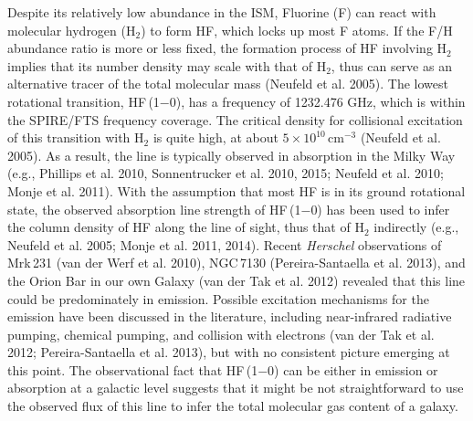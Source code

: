 \documentclass[preprint]{aastex}
\begin{document}
Despite its relatively low abundance in the ISM, Fluorine (F) can react with molecular hydrogen 
(H$_2$) to form HF, which locks up most F atoms. If the F/H abundance ratio is more or less
fixed, the formation process of HF involving H$_2$ implies that its number density may 
scale with that of H$_2$, thus can serve as an alternative tracer of the total molecular 
mass (Neufeld et al. 2005).  The lowest rotational transition, HF\,(1$-$0), has a frequency of
1232.476 GHz, which is within the SPIRE/FTS frequency coverage.  The critical density for collisional 
excitation of this transition with H$_2$ is quite high, at about $5\times 10^{10}$\,cm$^{-3}$  
(Neufeld et al. 2005).  As a result, the line is typically observed in absorption 
in the Milky Way  (e.g., Phillips et al. 2010, Sonnentrucker et al. 2010, 2015; Neufeld et al. 2010; 
Monje et al. 2011).   With the assumption that most HF is in its ground rotational state, 
the observed absorption line strength of HF\,(1$-$0) has been used to infer the column density
of HF along the line of sight, thus that of H$_2$ indirectly (e.g., Neufeld et al. 2005; 
Monje et al. 2011, 2014).  Recent {\it Herschel} observations of Mrk\,231 
(van der Werf et al. 2010), NGC\,7130 (Pereira-Santaella et al. 2013), and the Orion Bar 
in our own Galaxy (van der Tak et al. 2012) revealed that this line could be 
predominately in emission.  Possible excitation mechanisms for the emission have been
discussed in the literature, including near-infrared radiative pumping, chemical pumping, 
and collision with electrons (van der Tak et al. 2012; Pereira-Santaella et al. 2013), but
with no consistent picture emerging at this point.  The observational fact that HF\,(1$-$0)
can be either in emission or absorption at a galactic level suggests that it might be not 
straightforward to use the observed flux of this line to infer the total molecular
gas content of a galaxy.
\end{document}
